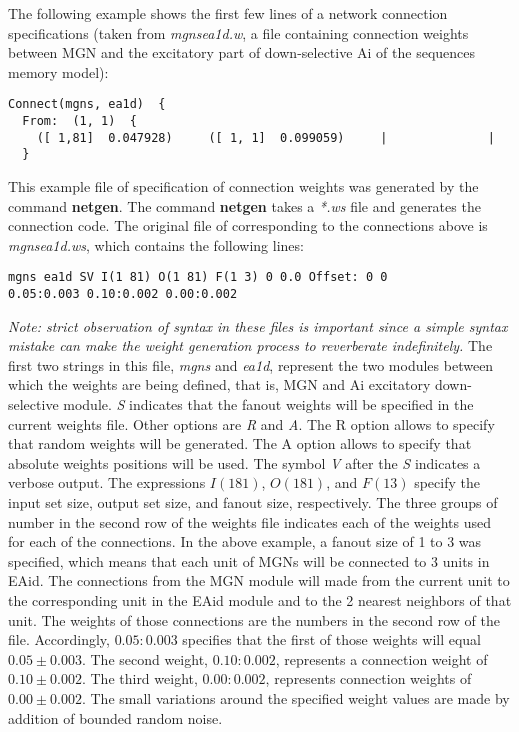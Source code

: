 \documentclass[12pt]{article}
\begin{document}
The following example shows the first few lines of a network
connection specifications
(taken from {\em mgnsea1d.w}, a file containing connection weights
between MGN and the excitatory part of down-selective Ai of the
sequences memory model):
\begin{verbatim}
Connect(mgns, ea1d)  {
  From:  (1, 1)  {
    ([ 1,81]  0.047928)     ([ 1, 1]  0.099059)     |              | 
  }
\end{verbatim}
This example file of specification of connection weights was generated
by the command {\bf netgen}. The command {\bf netgen} takes a {\em
*.ws} file and generates the connection code. The original file of
corresponding to the connections above is {\em mgnsea1d.ws}, which
contains the following lines:
\begin{verbatim}
mgns ea1d SV I(1 81) O(1 81) F(1 3) 0 0.0 Offset: 0 0
0.05:0.003 0.10:0.002 0.00:0.002
\end{verbatim}
{\em Note: strict observation of syntax in these files is important 
since a simple syntax mistake can make the weight generation process
to reverberate indefinitely.}
The first two strings in this file, {\em mgns} and {\em ea1d},
represent the two modules between which the weights are being
defined, that is, MGN and Ai excitatory down-selective module. {\em S} 
indicates that the fanout weights will be specified in
the current weights file. Other options are {\em R} and {\em A}. The R
option allows to specify that random weights will be generated. The A
option allows to specify that absolute weights positions will be
used. The symbol {\em V} after the {\em S} indicates a verbose output.  
The expressions $I(1 81)$, $O(1 81)$, and $F(1 3)$ specify the input
set size, output set size, and fanout size, respectively. The three
groups of number in the second row of the weights file indicates each
of the weights used for each of the connections. In the above example,
a fanout size of 1 to 3 was specified, which means that each unit of
MGNs will be connected to 3 units in EAid. The connections from the
MGN module will made from the current unit to the corresponding unit
in the EAid module and to the 2 nearest neighbors of that unit. The 
weights of those
connections are the numbers in the second row of the
file. Accordingly, $0.05:0.003$ specifies that the first of those
weights will equal $0.05 \pm 0.003$. The second weight, $0.10:0.002$,
represents a connection weight of $0.10 \pm 0.002$. The third weight,
$0.00:0.002$, represents connection weights of $0.00 \pm 0.002$. The
small variations around the specified weight values are made by
addition of bounded random noise. 
\end{document}
